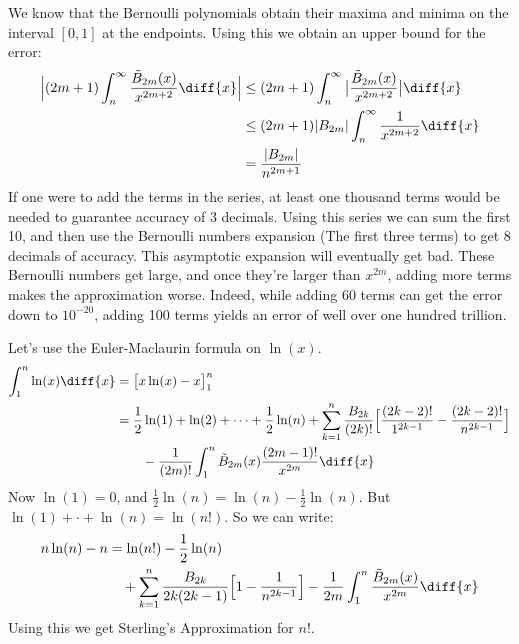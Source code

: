 \documentclass[crop=false,class=book,oneside]{standalone}
\begin{document}
        We know that the Bernoulli polynomials obtain their maxima and
        minima on the interval $[0,1]$ at the endpoints. Using this
        we obtain an upper bound for the error:
        \begin{align}
            \Big|(2m+1)\int_{n}^{\infty}
                \frac{\tilde{B}_{2m}(x)}{x^{2m+2}}\diff{x}\Big|
                &\leq(2m+1)\int_{n}^{\infty}
                    \big|\frac{\tilde{B}_{2m}(x)}{x^{2m+2}}\big|\diff{x}\\
                &\leq(2m+1)|B_{2m}|\int_{n}^{\infty}
                    \frac{1}{x^{2m+2}}\diff{x}\\
                &=\frac{|B_{2m}|}{n^{2m+1}}
        \end{align}
        If one were to add the terms in the series, at least one thousand
        terms would be needed to guarantee accuracy of 3 decimals. Using this
        series we can sum the first 10, and then use the Bernoulli numbers
        expansion (The first three terms) to get 8 decimals of accuracy.
        This asymptotic expansion will eventually get bad. These Bernoulli
        numbers get large, and once they're larger than $x^{2m}$, adding
        more terms makes the approximation worse. Indeed, while adding
        60 terms can get the error down to $10^{-20}$, adding 100 terms yields
        an error of well over one hundred trillion.
        \begin{lexample}
            Let's use the Euler-Maclaurin formula on $\ln(x)$.
            \begin{align}
                \int_{1}^{n}\ln(x)\diff{x}
                &=\big[x\ln(x)-x\big]_{1}^{n}\\
                \nonumber
                &=\frac{1}{2}\ln(1)+\ln(2)+\cdots+\frac{1}{2}\ln(n)
                    +\sum_{k=1}^{n}\frac{B_{2k}}{(2k)!}
                    \Big[
                        \frac{(2k-2)!}{1^{2k-1}}-\frac{(2k-2)!}{n^{2k-1}}
                    \Big]\\
                &\quad\quad
                    -\frac{1}{(2m)!}\int_{1}^{n}\tilde{B}_{2m}(x)
                    \frac{(2m-1)!}{x^{2m}}\diff{x}
            \end{align}
            Now $\ln(1)=0$, and $\frac{1}{2}\ln(n)=\ln(n)-\frac{1}{2}\ln(n)$.
            But $\ln(1)+\cdot+\ln(n)=\ln(n!)$. So we can write:
            \begin{align}
                \nonumber
                n\ln(n)-n&=\ln(n!)-\frac{1}{2}\ln(n)\\
                &\quad
                    +\sum_{k=1}^{n}\frac{B_{2k}}{2k(2k-1)}
                    \Big[1-\frac{1}{n^{2k-1}}\Big]
                    -\frac{1}{2m}\int_{1}^{n}
                    \frac{\tilde{B}_{2m}(x)}{x^{2m}}\diff{x}
            \end{align}
            Using this we get Sterling's Approximation for $n!$.
        \end{lexample}
\end{document}
